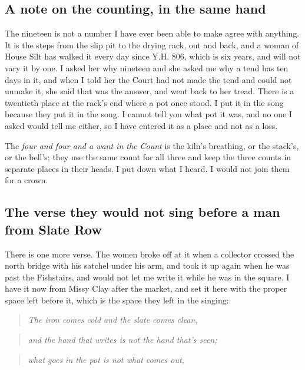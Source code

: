\documentclass{design/chronicle}
\begin{document}
\subsection*{A note on the counting, in the same hand}

The nineteen is not a number I have ever been able to make agree with anything. It is the steps from the slip pit to the drying rack, out and back, and a woman of House Silt has walked it every day since Y.H. 806, which is six years, and will not vary it by one. I asked her why nineteen and she asked me why a tend has ten days in it, and when I told her the Court had not made the tend and could not unmake it, she said that was the answer, and went back to her tread. There is a twentieth place at the rack’s end where a pot once stood. I put it in the song because they put it in the song. I cannot tell you what pot it was, and no one I asked would tell me either, so I have entered it as a place and not as a loss.

The \emph{four and four and a want in the Count} is the kiln’s breathing, or the stack’s, or the bell’s; they use the same count for all three and keep the three counts in separate places in their heads. I put down what I heard. I would not join them for a crown.

\subsection*{The verse they would not sing before a man from Slate Row}

There is one more verse. The women broke off at it when a collector crossed the north bridge with his satchel under his arm, and took it up again when he was past the Fishstairs, and would not let me write it while he was in the square. I have it now from Missy Clay after the market, and set it here with the proper space left before it, which is the space they left in the singing:

\begin{quote}\itshape The iron comes cold and the slate comes clean,\end{quote}

\begin{quote}\itshape and the hand that writes is not the hand that’s seen;\end{quote}

\begin{quote}\itshape what goes in the pot is not what comes out,\end{quote}
\end{document}
